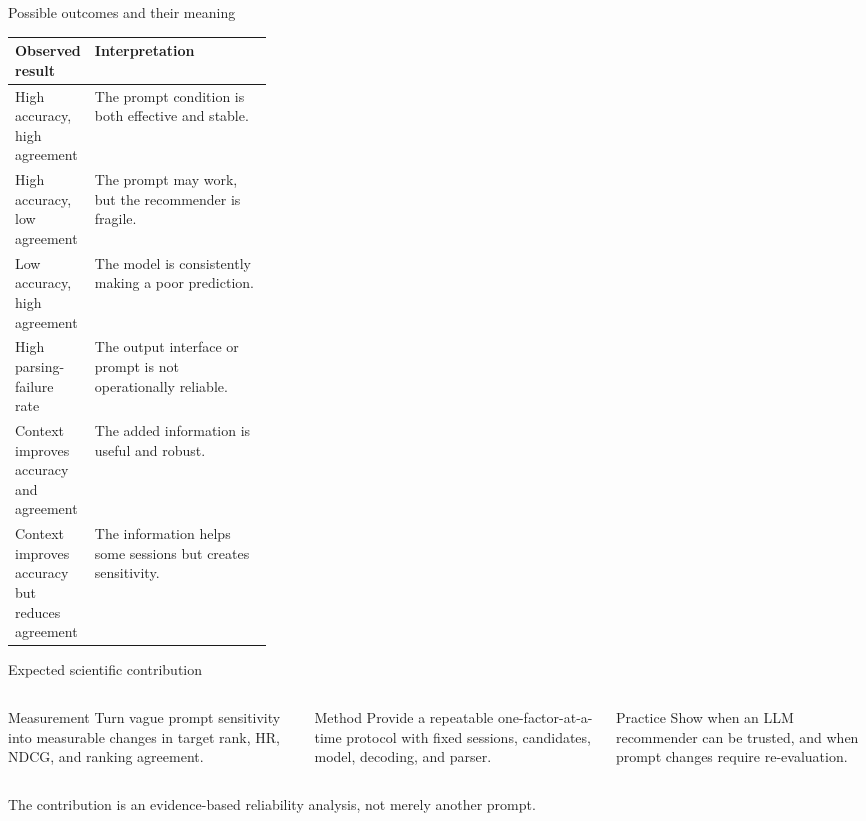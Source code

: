 \documentclass[aspectratio=169,12pt]{beamer}
\begin{document}
\begin{frame}{Possible outcomes and their meaning}
\begin{table}
\centering
\small
\begin{tabularx}{\linewidth}{@{}p{0.30\linewidth}X@{}}
\toprule
\textbf{Observed result} & \textbf{Interpretation}\\
\midrule
High accuracy, high agreement &
The prompt condition is both effective and stable.\\
High accuracy, low agreement &
The prompt may work, but the recommender is fragile.\\
Low accuracy, high agreement &
The model is consistently making a poor prediction.\\
High parsing-failure rate &
The output interface or prompt is not operationally reliable.\\
Context improves accuracy and agreement &
The added information is useful and robust.\\
Context improves accuracy but reduces agreement &
The information helps some sessions but creates sensitivity.\\
\bottomrule
\end{tabularx}
\end{table}
\end{frame}

\begin{frame}{Expected scientific contribution}
\begin{columns}[T]
\begin{block}{Measurement}
Turn vague prompt sensitivity into measurable changes in target rank, HR,
NDCG, and ranking agreement.
\end{block}

\begin{block}{Method}
Provide a repeatable one-factor-at-a-time protocol with fixed sessions,
candidates, model, decoding, and parser.
\end{block}

\begin{block}{Practice}
Show when an LLM recommender can be trusted, and when prompt changes require
re-evaluation.
\end{block}
\end{columns}

\vspace{0.7em}
\centering
\textcolor{DeepBlue}{The contribution is an evidence-based reliability analysis,
not merely another prompt.}
\end{frame}
\end{document}
